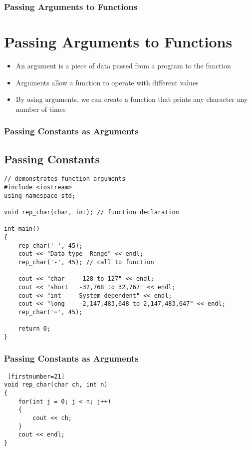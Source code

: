 \documentclass{beamer}
\begin{document}
\begin{frame}
    \frametitle{Passing Arguments to Functions}
    \section{Passing Arguments to Functions} %
    \label{sec:passing_arguments_to_functions}
    \begin{itemize}
        \item An argument is a piece of data passed from a program to the function
        \item Arguments allow a function to operate with different values
        \item By using arguments, we can create a function that prints any character any number of times
    \end{itemize}
\end{frame}

\begin{frame} [fragile]
    \frametitle{Passing Constants as Arguments}
    \subsection{Passing Constants} %
    \label{sub:passing_constants}
    \lstset{style=mystyle}
\begin{lstlisting}
// demonstrates function arguments
#include <iostream>
using namespace std;

void rep_char(char, int); // function declaration

int main()
{
    rep_char('-', 45);
    cout << "Data-type  Range" << endl;
    rep_char('-', 45); // call to function

    cout << "char    -128 to 127" << endl;
    cout << "short   -32,768 to 32,767" << endl;
    cout << "int     System dependent" << endl;
    cout << "long    -2,147,483,648 to 2,147,483,647" << endl;
    rep_char('=', 45);

    return 0;
}
\end{lstlisting}
\end{frame}

\begin{frame} [fragile]
    \frametitle{Passing Constants as Arguments}
    \lstset{style=mystyle}
\begin{lstlisting} [firstnumber=21]
void rep_char(char ch, int n)
{
    for(int j = 0; j < n; j++)
    {
        cout << ch;
    }
    cout << endl;
}
\end{lstlisting}
\end{frame}
\end{document}
